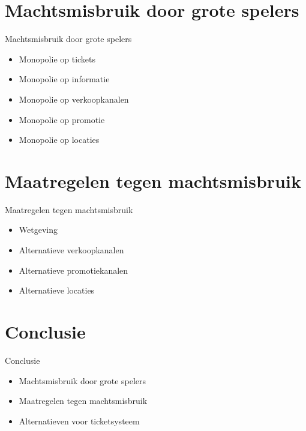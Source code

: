 \documentclass{beamer}
\begin{document}
    
    
\section[Machtsmisbruik]{Machtsmisbruik door grote spelers}
\begin{frame}{Machtsmisbruik door grote spelers}
    \begin{itemize}
        \item Monopolie op tickets
        \item Monopolie op informatie
        \item Monopolie op verkoopkanalen
        \item Monopolie op promotie
        \item Monopolie op locaties
    \end{itemize}
\end{frame}
    
\section[Maatregelen]{Maatregelen tegen machtsmisbruik}
\begin{frame}{Maatregelen tegen machtsmisbruik}
    \begin{itemize}
        \item Wetgeving
        \item Alternatieve verkoopkanalen
        \item Alternatieve promotiekanalen
        \item Alternatieve locaties
    \end{itemize}
\end{frame}
    
\section{Conclusie}
\begin{frame}{Conclusie}
    \begin{itemize}
        \item Machtsmisbruik door grote spelers
        \item Maatregelen tegen machtsmisbruik
        \item Alternatieven voor ticketsysteem
    \end{itemize}
\end{frame}
    
\end{document}
